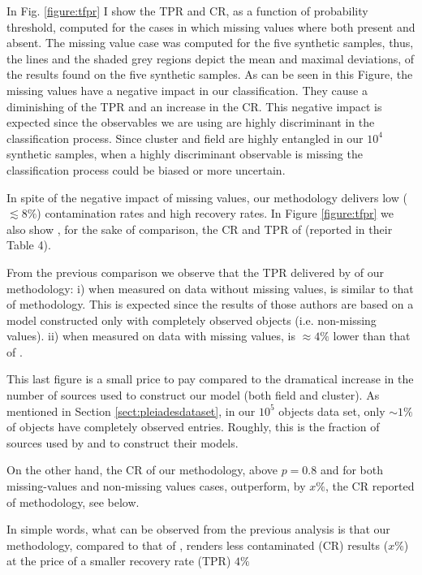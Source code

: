 In Fig. \ref{figure:tfpr} I show the TPR and CR, as a function of probability threshold, computed for the cases in which missing values where both present and absent. The missing value case was computed for the five synthetic samples, thus, the lines and the shaded grey regions depict the mean and maximal deviations, of the results found on the five synthetic samples. As can be seen in this Figure, the missing values have a negative impact in our classification. They cause a diminishing of the TPR  and an increase in the CR. This negative impact is expected since the observables we are using are highly discriminant in the classification process. Since cluster and field are highly entangled in our $10^4$ synthetic samples, when a highly discriminant observable is missing the classification process could be biased or more uncertain.

In spite of the negative impact of missing values, our methodology delivers low ($\lesssim 8\%$) contamination rates and high recovery rates. In Figure \ref{figure:tfpr} we also show , for the sake of comparison, the CR and TPR of \citet{Sarro2014} (reported in their Table 4). 

From the previous comparison we observe that the TPR delivered by of our methodology: i) when measured on data without missing values, is similar to that of \citet{Sarro2014} methodology. This is expected since the results of those authors are based on a model constructed only with completely observed objects (i.e. non-missing values). ii) when measured on data with missing values, is $\approx 4\%$ lower than that of \citet{Sarro2014}. 

This last figure is a small price to pay compared to the dramatical increase in the number of sources used to construct our model (both field and cluster). As mentioned in Section \ref{sect:pleiadesdataset}, in our $10^5$ objects data set, only $\sim 1\%$ of objects have completely observed entries. Roughly, this is the fraction of sources used by \citet{Sarro2014} and \citet{Bouy2015} to construct their models. 

On the other hand, the CR of our methodology, above $p=0.8$ and for both missing-values and non-missing values cases, outperform, by $x\%$, the CR reported of \citet{Sarro2014} methodology, see below.

In simple words, what can be observed from the previous analysis is that our methodology, compared to that of \citet{Sarro2014}, renders less contaminated (CR) results ($x\%$) at the price of a smaller recovery rate (TPR) $4\%$

